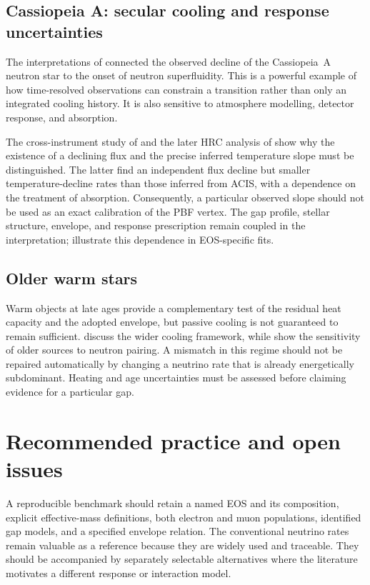 \documentclass{aa}
\begin{document}
\subsection{Cassiopeia A: secular cooling and response uncertainties}
The interpretations of \citet{Page2011,Shternin2011} connected the observed decline of the Cassiopeia~A neutron star to the onset of neutron superfluidity. This is a powerful example of how time-resolved observations can constrain a transition rather than only an integrated cooling history. It is also sensitive to atmosphere modelling, detector response, and absorption.

The cross-instrument study of \citet{Elshamouty2013} and the later HRC analysis of \citet{Zhao2025} show why the existence of a declining flux and the precise inferred temperature slope must be distinguished. The latter find an independent flux decline but smaller temperature-decline rates than those inferred from ACIS, with a dependence on the treatment of absorption. Consequently, a particular observed slope should not be used as an exact calibration of the PBF vertex. The gap profile, stellar structure, envelope, and response prescription remain coupled in the interpretation; \citet{Ho2015} illustrate this dependence in EOS-specific fits.

\subsection{Older warm stars}
Warm objects at late ages provide a complementary test of the residual heat capacity and the adopted envelope, but passive cooling is not guaranteed to remain sufficient. \citet{YakovlevPethick2004} discuss the wider cooling framework, while \citet{Potekhin2020} show the sensitivity of older sources to neutron pairing. A mismatch in this regime should not be repaired automatically by changing a neutrino rate that is already energetically subdominant. Heating and age uncertainties must be assessed before claiming evidence for a particular gap.



\section{Recommended practice and open issues}
A reproducible benchmark should retain a named EOS and its composition, explicit effective-mass definitions, both electron and muon populations, identified gap models, and a specified envelope relation. The conventional neutrino rates remain valuable as a reference because they are widely used and traceable. They should be accompanied by separately selectable alternatives where the literature motivates a different response or interaction model.
\end{document}
